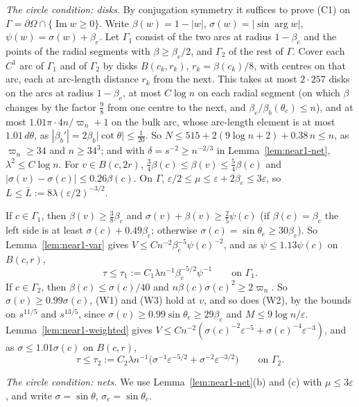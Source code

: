 \documentclass[11pt]{amsart}
\theoremstyle{definition}
\theoremstyle{remark}
\numberwithin{equation}{section}
\newcommand{\eps}{\varepsilon}
\DeclareMathOperator{\im}{Im}
\begin{document}
\emph{The circle condition: disks.} By conjugation symmetry it suffices to prove (C1) on $\Gamma=\partial\Omega\cap\{\im w\ge0\}$. Write $\beta(w)=1-|w|$, $\sigma(w)=|\sin\arg w|$, $\psi(w)=\sigma(w)+\beta_e$. Let $\Gamma_1$ consist of the two arcs at radius $1-\beta_e$ and the points of the radial segments with $\beta\ge\beta_e/2$, and $\Gamma_2$ of the rest of $\Gamma$. Cover each $C^1$ arc of $\Gamma_1$ and of $\Gamma_2$ by disks $B(c_k,r_k)$, $r_k=\beta(c_k)/8$, with centres on that arc, each at arc-length distance $r_k$ from the next. This takes at most $2\cdot257$ disks on the arcs at radius $1-\beta_e$, at most $C\log n$ on each radial segment (on which $\beta$ changes by the factor $\frac98$ from one centre to the next, and $\beta_e/\beta_b(\theta_e)\le n$), and at most $1.01\pi\cdot4n/\varpi_n+1$ on the bulk arc, whose arc-length element is at most $1.01\,d\theta$, as $|\beta_b'|=2\beta_b|\cot\theta|\le\frac1{20}$. So $N\le515+2(9\log n+2)+0.38\,n\le n$, as $\varpi_n\ge34$ and $n\ge34^3$; and with $\delta=s^{-2}\ge n^{-2/3}$ in Lemma~\ref{lem:near1-net}, $\lambda^2\le C\log n$. For $v\in B(c,2r)$, $\frac34\beta(c)\le\beta(v)\le\frac54\beta(c)$ and $|\sigma(v)-\sigma(c)|\le0.26\beta(c)$. On $\Gamma$, $\eps/2\le\mu\le\eps+2\beta_e\le3\eps$, so $L\le\bar L:=8\lambda(\eps/2)^{-3/2}$.

If $c\in\Gamma_1$, then $\beta(v)\ge\frac38\beta_e$ and $\sigma(v)+\beta(v)\ge\frac25\psi(c)$ (if $\beta(c)=\beta_e$ the left side is at least $\sigma(c)+0.49\beta_e$; otherwise $\sigma(c)=\sin\theta_e\ge30\beta_e$). So Lemma~\ref{lem:near1-var} gives $V\le Cn^{-2}\beta_e^{-5}\psi(c)^{-2}$, and as $\psi\le1.13\psi(c)$ on $B(c,r)$,
\[
\tau\le\tau_1:=C_1\lambda n^{-1}\beta_e^{-5/2}\psi^{-1}\qquad\text{on }\Gamma_1.
\]
If $c\in\Gamma_2$, then $\beta(c)\le\sigma(c)/40$ and $n\beta(c)\sigma(c)^2\ge2\varpi_n$. So $\sigma(v)\ge0.99\sigma(c)$, (W1) and (W3) hold at $v$, and so does (W2), by the bounds on $s^{11/5}$ and $s^{13/5}$, since $\sigma(v)\ge0.99\sin\theta_e\ge29\beta_e$ and $M\le9\log n/\eps$. Lemma~\ref{lem:near1-weighted} gives $V\le Cn^{-2}(\sigma(c)^{-2}\eps^{-5}+\sigma(c)^{-4}\eps^{-3})$, and as $\sigma\le1.01\sigma(c)$ on $B(c,r)$,
\[
\tau\le\tau_2:=C_2\lambda n^{-1}\bigl(\sigma^{-1}\eps^{-5/2}+\sigma^{-2}\eps^{-3/2}\bigr)\qquad\text{on }\Gamma_2.
\]

\emph{The circle condition: nets.} We use Lemma~\ref{lem:near1-net}(b) and (c) with $\mu\le3\eps$, and write $\sigma=\sin\theta$, $\sigma_e=\sin\theta_e$.
\end{document}
